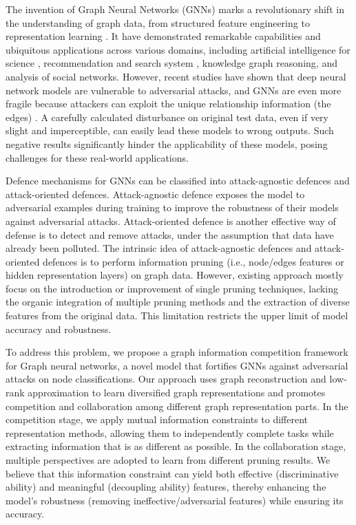 \documentclass[conference]{IEEEtran}
\begin{document}
The invention of Graph Neural Networks (GNNs)  \cite{Defferrard2016ConvolutionalNN} \cite{velickovic2018graph} \cite{Wu2019ACS} \cite{Sun2019InfoGraphUA} marks a revolutionary shift in the understanding of graph data, from structured feature engineering to representation learning \cite{Chen2019GraphRL} \cite{Khoshraftar2022ASO}. It have demonstrated remarkable capabilities and ubiquitous applications across various domains, including artificial intelligence for science \cite{Li2022MultiphysicalGN}, recommendation and search system \cite{Yang2021ConsisRecEG} \cite{Wang2022GNNbasedRA}, knowledge graph reasoning\cite{Qiu2023LogicalEO}, and analysis of social networks\cite{Si2022RecGNNRO}. However, recent studies \cite{xu2019topology} \cite{Zgner2019AdversarialAO} have shown that deep neural network models are vulnerable to adversarial attacks, and GNNs are even more fragile because attackers can exploit the unique relationship information (the edges) \cite{Zgner2018AdversarialAO}. A carefully calculated disturbance on original test data, even if very slight and imperceptible, can easily lead these models to wrong outputs. Such negative results significantly hinder the applicability of these models, posing challenges for these real-world applications.


Defence mechanisms for GNNs can be classified into attack-agnostic defences and attack-oriented defences. Attack-agnostic defence exposes the model to adversarial examples during training to improve the robustness of their models against adversarial attacks. Attack-oriented defence is another effective way of defense is to detect and remove attacks, under the assumption that data have already been polluted. 
The intrinsic idea of attack-agnostic defences and attack-oriented defences is to perform information pruning (i.e., node/edges features or hidden representation layers) on graph data. However, existing approach mostly focus on the introduction or improvement of single pruning techniques, lacking the organic integration of multiple pruning methods and the extraction of diverse features from the original data. This limitation restricts the upper limit of model accuracy and robustness.

To address this problem, we propose a graph information competition framework for Graph neural networks, a novel model that fortifies GNNs against adversarial attacks on node classifications. Our approach uses graph reconstruction and low-rank approximation to learn diversified graph representations and promotes competition and collaboration among different graph representation parts.
In the competition stage, we apply mutual information constraints to different representation methods, allowing them to independently complete tasks while extracting information that is as different as possible. In the collaboration stage, multiple perspectives are adopted to learn from different pruning results. We believe that this information constraint can yield both effective (discriminative ability) and meaningful (decoupling ability) features, thereby enhancing the model's robustness (removing ineffective/adversarial features) while ensuring its accuracy.
\end{document}
